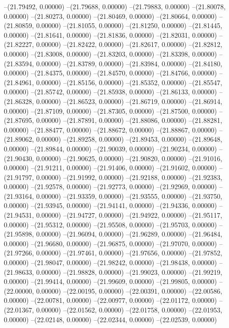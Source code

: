--(21.79492, 0.00000)
--(21.79688, 0.00000)
--(21.79883, 0.00000)
--(21.80078, 0.00000)
--(21.80273, 0.00000)
--(21.80469, 0.00000)
--(21.80664, 0.00000)
--(21.80859, 0.00000)
--(21.81055, 0.00000)
--(21.81250, 0.00000)
--(21.81445, 0.00000)
--(21.81641, 0.00000)
--(21.81836, 0.00000)
--(21.82031, 0.00000)
--(21.82227, 0.00000)
--(21.82422, 0.00000)
--(21.82617, 0.00000)
--(21.82812, 0.00000)
--(21.83008, 0.00000)
--(21.83203, 0.00000)
--(21.83398, 0.00000)
--(21.83594, 0.00000)
--(21.83789, 0.00000)
--(21.83984, 0.00000)
--(21.84180, 0.00000)
--(21.84375, 0.00000)
--(21.84570, 0.00000)
--(21.84766, 0.00000)
--(21.84961, 0.00000)
--(21.85156, 0.00000)
--(21.85352, 0.00000)
--(21.85547, 0.00000)
--(21.85742, 0.00000)
--(21.85938, 0.00000)
--(21.86133, 0.00000)
--(21.86328, 0.00000)
--(21.86523, 0.00000)
--(21.86719, 0.00000)
--(21.86914, 0.00000)
--(21.87109, 0.00000)
--(21.87305, 0.00000)
--(21.87500, 0.00000)
--(21.87695, 0.00000)
--(21.87891, 0.00000)
--(21.88086, 0.00000)
--(21.88281, 0.00000)
--(21.88477, 0.00000)
--(21.88672, 0.00000)
--(21.88867, 0.00000)
--(21.89062, 0.00000)
--(21.89258, 0.00000)
--(21.89453, 0.00000)
--(21.89648, 0.00000)
--(21.89844, 0.00000)
--(21.90039, 0.00000)
--(21.90234, 0.00000)
--(21.90430, 0.00000)
--(21.90625, 0.00000)
--(21.90820, 0.00000)
--(21.91016, 0.00000)
--(21.91211, 0.00000)
--(21.91406, 0.00000)
--(21.91602, 0.00000)
--(21.91797, 0.00000)
--(21.91992, 0.00000)
--(21.92188, 0.00000)
--(21.92383, 0.00000)
--(21.92578, 0.00000)
--(21.92773, 0.00000)
--(21.92969, 0.00000)
--(21.93164, 0.00000)
--(21.93359, 0.00000)
--(21.93555, 0.00000)
--(21.93750, 0.00000)
--(21.93945, 0.00000)
--(21.94141, 0.00000)
--(21.94336, 0.00000)
--(21.94531, 0.00000)
--(21.94727, 0.00000)
--(21.94922, 0.00000)
--(21.95117, 0.00000)
--(21.95312, 0.00000)
--(21.95508, 0.00000)
--(21.95703, 0.00000)
--(21.95898, 0.00000)
--(21.96094, 0.00000)
--(21.96289, 0.00000)
--(21.96484, 0.00000)
--(21.96680, 0.00000)
--(21.96875, 0.00000)
--(21.97070, 0.00000)
--(21.97266, 0.00000)
--(21.97461, 0.00000)
--(21.97656, 0.00000)
--(21.97852, 0.00000)
--(21.98047, 0.00000)
--(21.98242, 0.00000)
--(21.98438, 0.00000)
--(21.98633, 0.00000)
--(21.98828, 0.00000)
--(21.99023, 0.00000)
--(21.99219, 0.00000)
--(21.99414, 0.00000)
--(21.99609, 0.00000)
--(21.99805, 0.00000)
--(22.00000, 0.00000)
--(22.00195, 0.00000)
--(22.00391, 0.00000)
--(22.00586, 0.00000)
--(22.00781, 0.00000)
--(22.00977, 0.00000)
--(22.01172, 0.00000)
--(22.01367, 0.00000)
--(22.01562, 0.00000)
--(22.01758, 0.00000)
--(22.01953, 0.00000)
--(22.02148, 0.00000)
--(22.02344, 0.00000)
--(22.02539, 0.00000)
